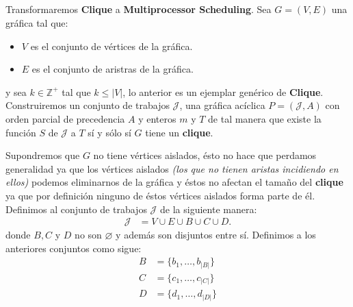 \documentclass[spanish, xcolor=dvipsnames, aspectratio=169]{beamer}
\newcommand{\subsectiontitle}{}
\begin{document}
\subsection{\subsectiontitle}
\begin{frame}{\subsectiontitle}
Transformaremos \textbf{Clique} a \textbf{Multiprocessor Scheduling}.
\newline 
Sea \(G = \left(V, E\right)\) una gráfica tal que:
\begin{itemize}
    \item \(V\) es el conjunto de vértices de la gráfica.
    \item \(E\) es el conjunto de aristras de la gráfica.
\end{itemize}
y sea \(k \in \mathbb{Z}^{+}\) tal que $k \leq |V|$, lo anterior es un ejemplar genérico de \textbf{Clique}.
\newline
Construiremos un conjunto de trabajos \(\mathcal{J}\), una gráfica acíclica \(P = \left(\mathcal{J}, A\right)\) con orden parcial de precedencia
\(A\) y enteros \(m\) y \(T\) de tal manera que existe la función \(S\) de \(\mathcal{J}\) a \(T\) sí y sólo sí \(G\) tiene un \textbf{clique}.
\end{frame}
\begin{frame}{\subsectiontitle}
Supondremos que \(G\) no tiene vértices aislados, ésto no hace que perdamos generalidad ya que los vértices aislados \textit{(los que no tienen aristas incidiendo en ellos)}
podemos eliminarnos de la gráfica y éstos no afectan el tamaño del \textbf{clique} ya que por definición ninguno de éstos vértices aislados forma parte de él.
\newline 
Definimos al conjunto de trabajos \(\mathcal{J}\) de la siguiente manera:
\begin{align*}
    \mathcal{J} &= V \cup E \cup B \cup C \cup D.
\end{align*}
donde \(B, C\) y \(D\) no son \(\varnothing\) y además son disjuntos entre sí. Definimos a los anteriores conjuntos como sigue:
\begin{align*}
    B &= \{b_{1}, \dotsc, b_{|B|}\} \\
    C &= \{c_{1}, \dotsc, c_{|C|}\} \\
    D &= \{d_{1}, \dotsc, d_{|D|}\} \\
\end{align*}
\end{frame}
\end{document}

